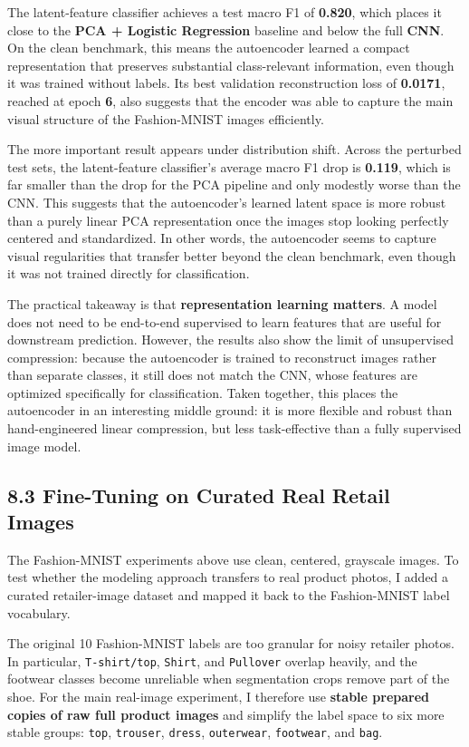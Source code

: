 \documentclass[11pt]{article}
\begin{document}
The latent-feature classifier achieves a test macro F1 of
\textbf{0.820}, which places it close to the \textbf{PCA + Logistic
Regression} baseline and below the full \textbf{CNN}. On the clean
benchmark, this means the autoencoder learned a compact representation
that preserves substantial class-relevant information, even though it
was trained without labels. Its best validation reconstruction loss of
\textbf{0.0171}, reached at epoch \textbf{6}, also suggests that the
encoder was able to capture the main visual structure of the
Fashion-MNIST images efficiently.

The more important result appears under distribution shift. Across the
perturbed test sets, the latent-feature classifier's average macro F1
drop is \textbf{0.119}, which is far smaller than the drop for the PCA
pipeline and only modestly worse than the CNN. This suggests that the
autoencoder's learned latent space is more robust than a purely linear
PCA representation once the images stop looking perfectly centered and
standardized. In other words, the autoencoder seems to capture visual
regularities that transfer better beyond the clean benchmark, even
though it was not trained directly for classification.

The practical takeaway is that \textbf{representation learning matters}.
A model does not need to be end-to-end supervised to learn features that
are useful for downstream prediction. However, the results also show the
limit of unsupervised compression: because the autoencoder is trained to
reconstruct images rather than separate classes, it still does not match
the CNN, whose features are optimized specifically for classification.
Taken together, this places the autoencoder in an interesting middle
ground: it is more flexible and robust than hand-engineered linear
compression, but less task-effective than a fully supervised image
model.

    \subsection{8.3 Fine-Tuning on Curated Real Retail
Images}\label{fine-tuning-on-curated-real-retail-images}

The Fashion-MNIST experiments above use clean, centered, grayscale
images. To test whether the modeling approach transfers to real product
photos, I added a curated retailer-image dataset and mapped it back to
the Fashion-MNIST label vocabulary.

The original 10 Fashion-MNIST labels are too granular for noisy retailer
photos. In particular, \texttt{T-shirt/top}, \texttt{Shirt}, and
\texttt{Pullover} overlap heavily, and the footwear classes become
unreliable when segmentation crops remove part of the shoe. For the main
real-image experiment, I therefore use \textbf{stable prepared copies of
raw full product images} and simplify the label space to six more stable
groups: \texttt{top}, \texttt{trouser}, \texttt{dress},
\texttt{outerwear}, \texttt{footwear}, and \texttt{bag}.
\end{document}
